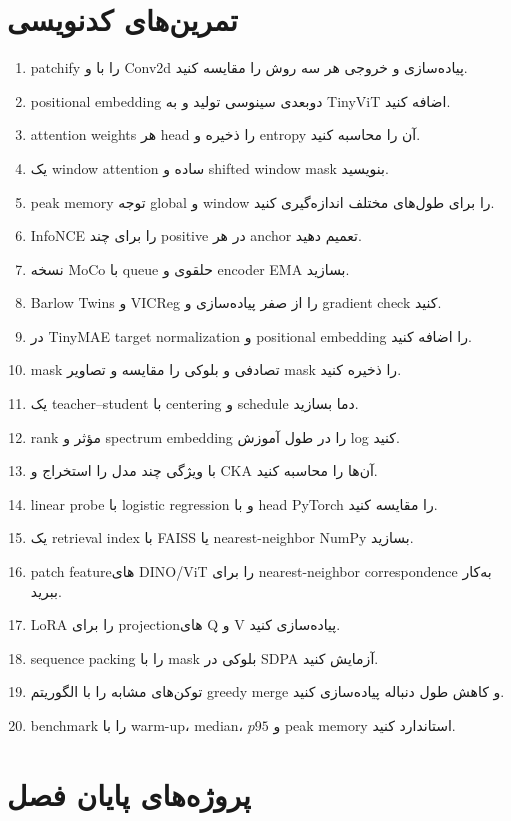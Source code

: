 \documentclass[12pt,openany,oneside]{book}
\begin{document}
\section{تمرین‌های کدنویسی}
\begin{enumerate}[label=\arabic*.]
\item patchify را با  و Conv2d پیاده‌سازی و خروجی هر سه روش را مقایسه کنید.
\item positional embedding دوبعدی سینوسی تولید و به TinyViT اضافه کنید.
\item attention weights هر head را ذخیره و entropy آن را محاسبه کنید.
\item یک window attention ساده و shifted window mask بنویسید.
\item peak memory توجه global و window را برای طول‌های مختلف اندازه‌گیری کنید.
\item InfoNCE را برای چند positive در هر anchor تعمیم دهید.
\item نسخه MoCo با queue حلقوی و encoder EMA بسازید.
\item Barlow Twins و VICReg را از صفر پیاده‌سازی و gradient check کنید.
\item در TinyMAE target normalization و positional embedding را اضافه کنید.
\item mask تصادفی و بلوکی را مقایسه و تصاویر mask را ذخیره کنید.
\item یک teacher--student با centering و schedule دما بسازید.
\item rank مؤثر و spectrum embedding را در طول آموزش log کنید.
\item با  ویژگی چند مدل را استخراج و CKA آن‌ها را محاسبه کنید.
\item linear probe با logistic regression و با head PyTorch را مقایسه کنید.
\item یک retrieval index با FAISS یا nearest-neighbor NumPy بسازید.
\item patch featureهای DINO/ViT را برای nearest-neighbor correspondence به‌کار ببرید.
\item LoRA را برای projectionهای Q و V پیاده‌سازی کنید.
\item sequence packing را با mask بلوکی در SDPA آزمایش کنید.
\item توکن‌های مشابه را با الگوریتم greedy merge و کاهش طول دنباله پیاده‌سازی کنید.
\item benchmark را با warm-up، median، $p95$ و peak memory استاندارد کنید.
\end{enumerate}

\section{پروژه‌های پایان فصل}
\end{document}
